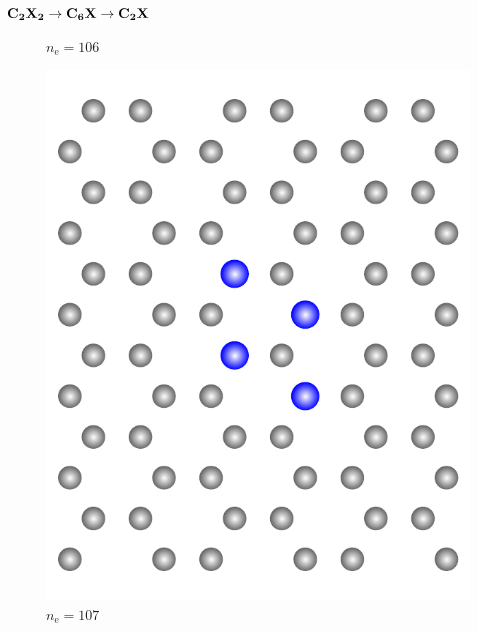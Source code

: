 \documentclass{beamer}
\def \nE {n_\mathrm{e}}
\begin{document}
\begin{frame}{$\bf C_{\boldsymbol 2}X_{\boldsymbol 2} \rightarrow C_{\boldsymbol 6}X \rightarrow C_{\boldsymbol 2}X$}
\begin{figure}
\begin{minipage}[b]{0.19\textwidth}
				$\nE = 106$
			\end{minipage}
			\hfill
			\begin{minipage}[b]{0.19\textwidth}
				\centering
				\includegraphics[height=1.1\textwidth]{Abbildungen/ne107.pdf} \\
				$\nE = 107$
			\end{minipage}
			\hfill
			\begin{minipage}[b]{0.19\textwidth}
				\centering

\end{minipage}
\end{figure}
\end{frame}
\end{document}
